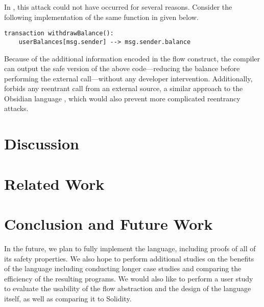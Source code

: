 \documentclass[dvipsnames, usenames, sigconf]{acmart}
\begin{document}
In \langName, this attack could not have occurred for several reasons.
Consider the following implementation of the same function in \langName given below.
\begin{lstlisting}[language=flow]
transaction withdrawBalance():
    userBalances[msg.sender] --> msg.sender.balance
\end{lstlisting}
Because of the additional information encoded in the flow construct, the compiler can output the safe version of the above code---reducing the balance before performing the external call---without any developer intervention.
Additionally, \langName forbids any reentrant call from an external source, a similar approach to the Obsidian language , which would also prevent more complicated reentrancy attacks.

\section{Discussion}

\section{Related Work}

\section{Conclusion and Future Work}


In the future, we plan to fully implement the \langName language, including proofs of all of its safety properties.
We also hope to perform additional studies on the benefits of the language including conducting longer case studies and comparing the efficiency of the resulting programs.
We would also like to perform a user study to evaluate the usability of the flow abstraction and the design of the language itself, as well as comparing it to Solidity.



\end{document}
